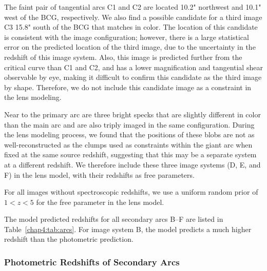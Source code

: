 The faint pair of tangential arcs C1 and C2 are located 10.2" northwest and 10.1" west of the BCG, respectively. We also find a possible candidate for a third image C3 15.8" south of the BCG that matches in color. The location of this candidate is consistent with the image configuration; however, there is a large statistical error on the predicted location of the third image, due to the uncertainty in the redshift of this image system. Also, this image is predicted further from the critical curve than C1 and C2, and has a lower magnification and tangential shear observable by eye, making it difficult to confirm this candidate as the third image by shape. Therefore, we do not include this candidate image as a constraint in the lens modeling.

Near to the primary arc are three bright specks that are slightly different in color than the main arc and are also triply imaged in the same configuration. During the lens modeling process, we found that the positions of these blobs are not as well-reconstructed as the clumps used as constraints within the giant arc when fixed at the same source redshift, suggesting that this may be a separate system at a different redshift. We therefore include these three image systems (D, E, and F) in the lens model, with their redshifts as free parameters.

For all images without spectroscopic redshifts, we use a uniform random prior of $1<z<5$ for the free parameter in the lens model.

The model predicted redshifts for all secondary arcs B--F are listed in Table~\ref{chap4:tab:arcs}. For image system B, the model predicts a much higher redshift than the photometric prediction.

\subsubsection{Photometric Redshifts of Secondary Arcs}
\label{chap4:subsec:photoz}

